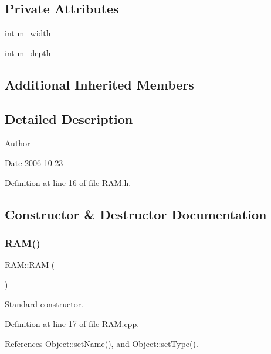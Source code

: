 \subsection*{Private Attributes}
\begin{DoxyCompactItemize}
\item 
int \hyperlink{classRAM_a9921651055311f968a843e2931f45164}{m\+\_\+width}
\item 
int \hyperlink{classRAM_a7f23b0ac79ae5d954c968814c628ac53}{m\+\_\+depth}
\end{DoxyCompactItemize}
\subsection*{Additional Inherited Members}


\subsection{Detailed Description}
\begin{DoxyAuthor}{Author}

\end{DoxyAuthor}
\begin{DoxyDate}{Date}
2006-\/10-\/23 
\end{DoxyDate}


Definition at line 16 of file R\+A\+M.\+h.



\subsection{Constructor \& Destructor Documentation}
\mbox{\label{classRAM_a25289e9f70eb7de231f869a6032f179b}} 
\subsubsection{\texorpdfstring{R\+A\+M()}{RAM()}}
{\footnotesize\ttfamily R\+A\+M\+::\+R\+AM (\begin{DoxyParamCaption}{ }\end{DoxyParamCaption})}



Standard constructor. 



Definition at line 17 of file R\+A\+M.\+cpp.



References Object\+::set\+Name(), and Object\+::set\+Type().


